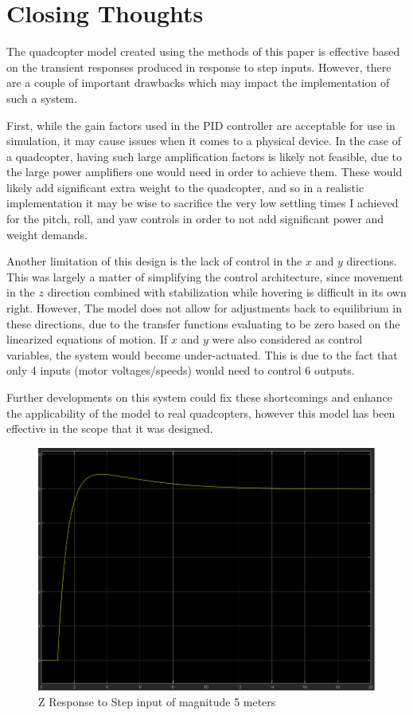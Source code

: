 \documentclass[12pt]{article}
\begin{document}
\section*{Closing Thoughts}
The quadcopter model created using the methods of this paper is effective based on the transient responses produced in 
response to step inputs. However, there are a couple of important drawbacks which may impact the implementation of such a system.
\par
First, while the gain factors used in the PID controller are acceptable for use in simulation, it may cause issues when it comes to 
a physical device. In the case of a quadcopter, having such large amplification factors is likely not feasible, due to the large 
power amplifiers one would need in order to achieve them. These would likely add significant extra weight to the quadcopter, and 
so in a realistic implementation it may be wise to sacrifice the very low settling times I achieved for the pitch, roll, and yaw controls
in order to not add significant power and weight demands.
\par
Another limitation of this design is the lack of control in the $x$ and $y$ directions. This was largely a matter of simplifying the 
control architecture, since movement in the $z$ direction combined with stabilization while hovering is difficult in its own right. However,
The model does not allow for adjustments back to equilibrium in these directions, due to the transfer functions evaluating to be zero 
based on the linearized equations of motion. If $x$ and $y$ were also considered as control variables, the system would become under-actuated. 
This is due to the fact that only 4 inputs (motor voltages/speeds) would need to control 6 outputs.   
\par
Further developments on this system could fix these shortcomings and enhance the applicability of the model to real quadcopters,
however this model has been effective in the scope that it was designed.

\newpage
\begin{figure}[h]
\includegraphics[width=0.9\linewidth]{images/Z_response.png}
\centering
\caption{Z Response to Step input of magnitude 5 meters}
\end{figure}
\end{document}
